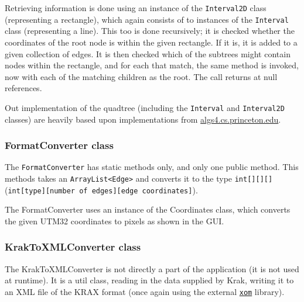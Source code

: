 \documentclass[a4paper,11pt]{article}
\begin{document}
Retrieving information is done using an instance of the \texttt{Interval2D} class (representing a rectangle), which again consists of to instances of the \texttt{Interval} class (representing a line). This too is done recursively; it is checked whether the coordinates of the root node is within the given rectangle. If it is, it is added to a given collection of edges. It is then checked which of the subtrees might contain nodes within the rectangle, and for each that match, the same method is invoked, now with each of the matching children as the root. The call returns at null references.

Out implementation of the quadtree (including the \texttt{Interval} and \texttt{Interval2D} classes) are heavily based upon implementations from
\url{algs4.cs.princeton.edu}.


\subsubsection{FormatConverter class} %
The \texttt{FormatConverter} has static methods only, and only one public method. This methods takes an \texttt{ArrayList<Edge>} and converts it to the type \texttt{int[][][]} (\texttt{int[type][number of edges][edge coordinates]}).

The FormatConverter uses an instance of the Coordinates class, which converts the given UTM32 coordinates to pixels as shown in the GUI.

\subsubsection{KrakToXMLConverter class} %
The KrakToXMLConverter is not directly a part of the application (it is not used at runtime). It is a util class, reading in the data supplied by Krak, writing it to an XML file of the KRAX format (once again using the external \href{www.xom.nu}{\texttt{xom}} library).
\end{document}

